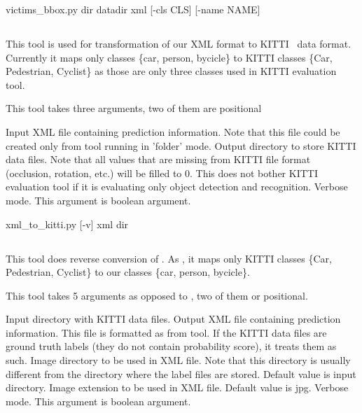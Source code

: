 \begin{usage}
victims_bbox.py dir datadir xml [-cls CLS] [-name NAME]
\end{usage}

\subsection{} \label{xtk}
This tool is used for transformation of our XML format to KITTI~\cite{kitti} data format. Currently it maps only classes \{car, person, bycicle\} to KITTI classes \{Car, Pedestrian, Cyclist\} as those are only three classes used in KITTI evaluation tool.

This tool takes three arguments, two of them are positional
\begin{description}
 Input XML file containing prediction information. Note that this file could be created only from \hyperref[rec]{} tool running in 'folder' mode.
 Output directory to store KITTI data files. Note that all values that are missing from KITTI file format (occlusion, rotation, etc.) will be filled to 0. This does not bother KITTI evaluation tool if it is evaluating only object detection and recognition.
 Verbose mode. This argument is boolean argument.
\end{description}

\begin{usage}
xml_to_kitti.py [-v] xml dir
\end{usage}

\subsection{} \label{ktx}
This tool does reverse conversion of \hyperref[xtk]{}. As , it maps only KITTI classes \{Car, Pedestrian, Cyclist\} to our classes \{car, person, bycicle\}.

This tool takes 5 arguments as opposed to \hyperref[xtk]{}, two of them or positional.
\begin{description}
 Input directory with KITTI data files.
 Output XML file containing prediction information. This file is formatted as from \hyperref[rec]{} tool. If the KITTI data files are ground truth labels (they do not contain probability score), it treats them as such.
 Image directory to be used in XML file. Note that this directory is usually different from the directory where the label files are stored. Default value is input directory.
 Image extension to be used in XML file. Default value is jpg.
 Verbose mode. This argument is boolean argument.
\end{description}

